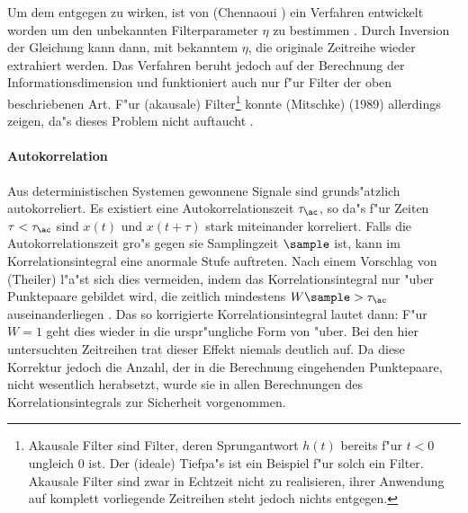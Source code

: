 Um dem entgegen zu wirken, ist von \autor(Chennaoui \etal) ein Verfahren entwickelt worden 
um den unbekannten Filterparameter $\eta$ zu bestimmen \cite{Chennaoui}. Durch Inversion der Gleichung
 kann dann, mit bekanntem $\eta$, die originale Zeitreihe wieder
extrahiert werden. Das Verfahren beruht jedoch auf der Berechnung der
Informationsdimension und funktioniert auch nur f"ur Filter der oben beschriebenen
Art. F"ur \begriff(akausale) Filter\footnote{Akausale Filter sind Filter, deren
Sprungantwort $h(t)$ bereits f"ur $t<0$ ungleich 0 ist. Der \begriff(ideale) Tiefpa"s
ist ein Beispiel f"ur solch ein Filter. Akausale Filter sind zwar in Echtzeit nicht zu
realisieren, ihrer Anwendung auf komplett vorliegende Zeitreihen steht jedoch nichts
entgegen.} konnte \autor(Mitschke) (1989) allerdings zeigen, da"s dieses Problem nicht 
auftaucht \cite{Mitschke}.

\paragraph{Autokorrelation}
\label{corrdimtheiler}
Aus deterministischen Systemen gewonnene Signale sind grunds"atzlich autokorreliert. Es
existiert eine Autokorrelationszeit $\tau_\ac$, so da"s f"ur Zeiten $\tau<\tau_\ac$ sind
$x(t)$ und $x(t+\tau)$ stark miteinander korreliert. Falls die Autokorrelationszeit gro"s 
gegen sie Samplingzeit $\sample$ ist, kann im Korrelationsintegral eine anormale Stufe
auftreten. Nach einem Vorschlag von \autor(Theiler) l"a"st sich dies vermeiden, indem das
Korrelationsintegral nur "uber Punktepaare  gebildet wird, die zeitlich mindestens
$W\sample>\tau_\ac$ auseinanderliegen \cite{Theiler}. Das so korrigierte Korrelationsintegral lautet dann:
F"ur $W=1$ geht dies wieder in die urspr"ungliche Form von  "uber. Bei
den hier untersuchten Zeitreihen trat dieser Effekt niemals deutlich auf. Da diese
Korrektur jedoch die Anzahl, der in die Berechnung eingehenden Punktepaare, nicht
wesentlich herabsetzt, wurde sie in allen Berechnungen des Korrelationsintegrals zur
Sicherheit vorgenommen.

